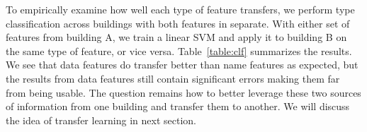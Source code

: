 To empirically examine how well each type of feature transfers, we perform type classification across buildings with both features in separate. With either set of features from building A, we train a linear SVM and apply it to building B on the same type of feature, or vice versa. Table~\ref{table:clf} summarizes the results.
We see that data features do transfer better than name features as expected, but the results from data features still contain significant errors making them far from being usable. 
The question remains how to better leverage these two sources of information from one building and transfer them to another.
We will discuss the idea of transfer learning in next section.

